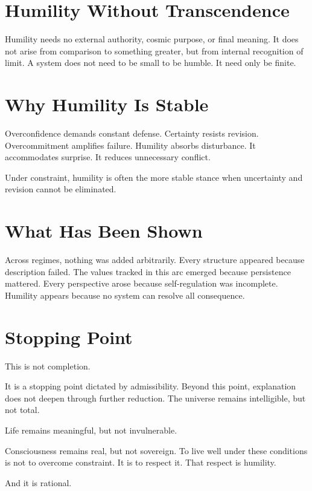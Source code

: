 \documentclass[11pt,twoside,openright]{book}
\begin{document}
\section*{Humility Without Transcendence}

Humility needs no external authority, cosmic purpose, or final meaning. It does not arise from comparison to something greater, but from internal recognition of limit. A system does not need to be small to be humble. It need only be finite.

\section*{Why Humility Is Stable}

Overconfidence demands constant defense. Certainty resists revision. Overcommitment amplifies failure. Humility absorbs disturbance. It accommodates surprise. It reduces unnecessary conflict.

Under constraint, humility is often the more stable stance when uncertainty and revision cannot be eliminated.

\section*{What Has Been Shown}

Across regimes, nothing was added arbitrarily. Every structure appeared because description failed. The values tracked in this arc emerged because persistence mattered. Every perspective arose because self-regulation was incomplete. Humility appears because no system can resolve all consequence.

\section*{Stopping Point}

This is not completion.

It is a stopping point dictated by admissibility. Beyond this point, explanation does not deepen through further reduction. The universe remains intelligible, but not total.

Life remains meaningful, but not invulnerable.

Consciousness remains real, but not sovereign. To live well under these conditions is not to overcome constraint. It is to respect it. That respect is humility.

And it is rational.
\end{document}

